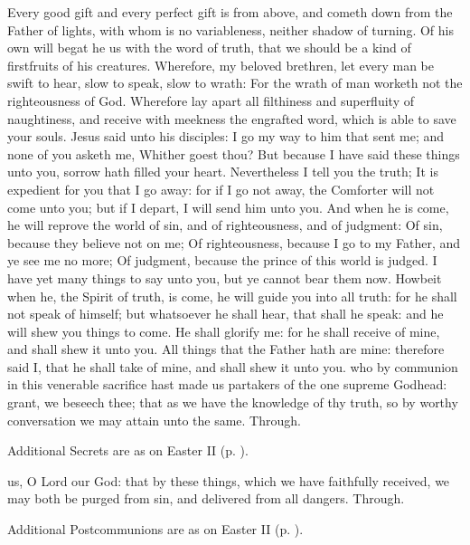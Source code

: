  Every good gift and every perfect gift is from above, and cometh down from the Father of lights, with whom is no variableness, neither shadow of turning. Of his own will begat he us with the word of truth, that we should be a kind of firstfruits of his creatures. Wherefore, my beloved brethren, let every man be swift to hear, slow to speak, slow to wrath: For the wrath of man worketh not the righteousness of God. Wherefore lay apart all filthiness and superfluity of naughtiness, and receive with meekness the engrafted word, which is able to save your souls.
 Jesus said unto his disciples: I go my way to him that sent me; and none of you asketh me, Whither goest thou? But because I have said these things unto you, sorrow hath filled your heart. Nevertheless I tell you the truth; It is expedient for you that I go away: for if I go not away, the Comforter will not come unto you; but if I depart, I will send him unto you. And when he is come, he will reprove the world of sin, and of righteousness, and of judgment: Of sin, because they believe not on me; Of righteousness, because I go to my Father, and ye see me no more; Of judgment, because the prince of this world is judged. I have yet many things to say unto you, but ye cannot bear them now. Howbeit when he, the Spirit of truth, is come, he will guide you into all truth: for he shall not speak of himself; but whatsoever he shall hear, that shall he speak: and he will shew you things to come. He shall glorify me: for he shall receive of mine, and shall shew it unto you. All things that the Father hath are mine: therefore said I, that he shall take of mine, and shall shew it unto you.
\secret
{} who by communion in this venerable sacrifice hast made us partakers of the one supreme Godhead: grant, we beseech thee; that as we have the knowledge of thy truth, so by worthy conversation we may attain unto the same. Through.
\begin{rubric}
    Additional Secrets are as on Easter II (p. \pageref{EasterIISecret}).
\end{rubric}
\postcommunion
{} us, O Lord our God: that by these things, which we have faithfully received, we may both be purged from sin, and delivered from all dangers. Through.
\begin{rubric}
    Additional Postcommunions are as on Easter II (p. \pageref{EasterIIPostcommunion}).
\end{rubric}

